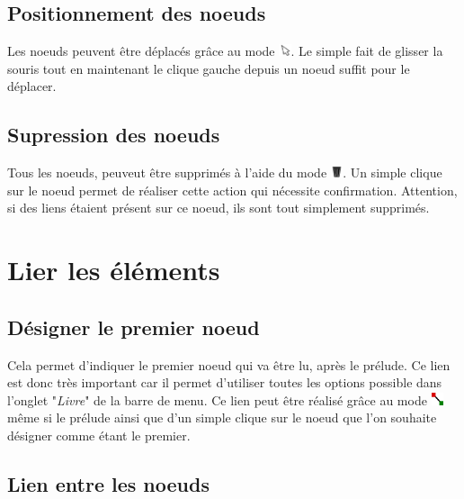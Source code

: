 		\subsection{Positionnement des noeuds}

			Les noeuds peuvent être déplacés grâce au mode \includegraphics[height=10pt]{img/icons/select.png}. Le simple fait de glisser la souris tout en maintenant le clique gauche depuis un noeud suffit pour le déplacer.

		\subsection{Supression des noeuds}

			Tous les noeuds, peuveut être supprimés à l'aide du mode \includegraphics[height=10pt, keepaspectratio]{img/icons/delete.png}. Un simple clique sur le noeud permet de réaliser cette action qui nécessite confirmation. Attention, si des liens étaient présent sur ce noeud, ils sont tout simplement supprimés.

	\section{Lier les éléments}
		\label{sec:lien}

		\subsection{Désigner le premier noeud}

			Cela permet d'indiquer le premier noeud qui va être lu, après le prélude. Ce lien est donc très important car il permet d'utiliser toutes les options possible dans l'onglet "\textit{Livre}" de la barre de menu. Ce lien peut être réalisé grâce au mode \includegraphics[height=10pt, keepaspectratio]{img/icons/first_node.png} même si le prélude ainsi que d'un simple clique sur le noeud que l'on souhaite désigner comme étant le premier.

		\subsection{Lien entre les noeuds}

